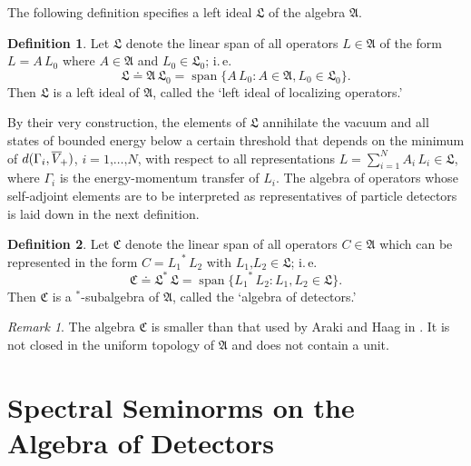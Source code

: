 \documentclass[11pt,twoside,openright]{report}
\theoremstyle{definition}
\newtheorem{Def}{Definition}[chapter]
\theoremstyle{plain}
\theoremstyle{remark}
\newtheorem*{Rem}{Remark}
\theoremstyle{assumption}
\DeclareMathOperator{\linhull}{span}
\newcommand{\bset}[1]{\bigl\{ #1 \bigr\}}
\newcommand{\Afrak}{\mathfrak{A}}
\newcommand{\Cfrak}{\mathfrak{C}}
\newcommand{\Lfrak}{\mathfrak{L}}
\newcommand{\fwcone}{\overline{V}_{\negthinspace +}}
\begin{document}
The following definition specifies a left ideal $\Lfrak$ of the
algebra $\Afrak$. 
\begin{Def}
  \label{Def-localizer-ideal}
  Let $\Lfrak$ denote the linear span of all operators $L \in \Afrak$
  of the form $L = A \, L_0$ where $A \in \Afrak$ and $L_0 \in
  \Lfrak_0$; i.\,e.
  \begin{equation*}
    \Lfrak \doteq \Afrak \, \Lfrak_0 = \linhull \bset{A \, L_0 : A \in
      \Afrak , L_0 \in \Lfrak_0} \text{.}
  \end{equation*}
  Then $\Lfrak$ is a left ideal of $\Afrak$, called the `left ideal of
  localizing operators.' 
\end{Def}
By their very construction, the elements of $\Lfrak$ annihilate the
vacuum and all states of bounded energy below a certain threshold that
depends on the minimum of $d ( \Gamma_i , \fwcone )$, $i = 1 \text{,}
\dots \text{,} N$, with respect to all representations $L =
\sum_{i = 1}^N A_i \, L_i \in \Lfrak$, where $\Gamma_i$ is the
energy-momentum transfer of $L_i$. The algebra of operators whose
self-adjoint elements are to be interpreted as representatives of
particle detectors is laid down in the next definition.
\begin{Def}
  \label{Def-counter-algebra}
  Let $\Cfrak$ denote the linear span of all operators $C \in \Afrak$
  which can be represented in the form $C = {L_1}^* \, L_2$ with $L_1
  \text{,} L_2 \in \Lfrak$; i.\,e.
  \begin{equation*}
    \Cfrak \doteq \Lfrak^* \, \Lfrak = \linhull \bset{{L_1}^* \, L_2 :
     L_1 , L_2 \in \Lfrak} \text{.}
  \end{equation*}
  Then $\Cfrak$ is a $^*$-subalgebra of $\Afrak$, called the `algebra
  of detectors.'
\end{Def}
\begin{Rem}
  The algebra $\Cfrak$ is smaller than that used by Araki and Haag in
  \cite{araki/haag:1967}. It is not closed in the uniform topology of
  $\Afrak$ and does not contain a unit. 
\end{Rem}


\section{Spectral Seminorms on the Algebra of Detectors}
\end{document}
